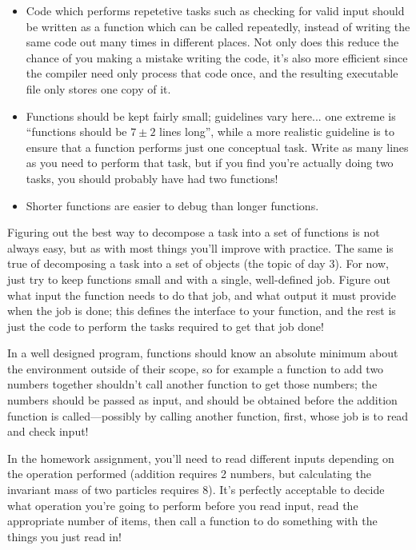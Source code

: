 \documentclass[a4paper]{scrartcl}
\begin{document}
\begin{itemize}
	\item Code which performs repetetive tasks such as checking for valid input should be written as a function which can be called repeatedly, instead of writing the same code out many times in different places. Not only does this reduce the chance of you making a mistake writing the code, it's also more efficient since the compiler need only process that code once, and the resulting executable file only stores one copy of it.
	\item Functions should be kept fairly small; guidelines vary here... one extreme is ``functions should be $7\pm 2$ lines long'', while a more realistic guideline is to ensure that a function performs just one conceptual task. Write as many lines as you need to perform that task, but if you find you're actually doing two tasks, you should probably have had two functions!
	\item Shorter functions are easier to debug than longer functions.
\end{itemize}

Figuring out the best way to decompose a task into a set of functions is not always easy, but as with most things you'll improve with practice. The same is true of decomposing a task into a set of objects (the topic of day 3). For now, just try to keep functions small and with a single, well-defined job. Figure out what input the function needs to do that job, and what output it must provide when the job is done; this defines the interface to your function, and the rest is just the code to perform the tasks required to get that job done!

In a well designed program, functions should know an absolute minimum about the environment outside of their scope, so for example a function to add two numbers together shouldn't call another function to get those numbers; the numbers should be passed as input, and should be obtained before the addition function is called---possibly by calling another function, first, whose job is to read and check input!

In the homework assignment, you'll need to read different inputs depending on the operation performed (addition requires 2 numbers, but calculating the invariant mass of two particles requires 8). It's perfectly acceptable to decide what operation you're going to perform before you read input, read the appropriate number of items, then call a function to do something with the things you just read in!
\end{document}
